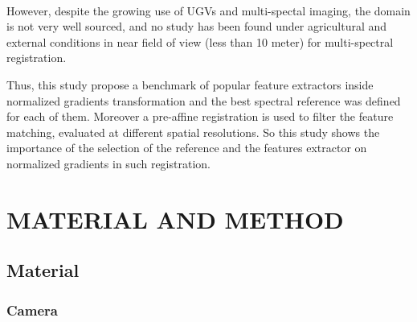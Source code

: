 \documentclass[a4paper,twoside]{article}
\begin{document}
	\\
	\par However, despite the growing use of UGVs and multi-spectal imaging, the domain is not very well sourced,
	and no study has been found under agricultural and external conditions in near field of view (less than 10 meter) for multi-spectral registration.
	\\
	\par Thus, this study propose a benchmark of popular feature extractors inside normalized gradients transformation
	and the best spectral reference was defined for each of them.
	Moreover a pre-affine registration is used to filter the feature matching, evaluated at different spatial resolutions.
	So this study shows the importance of the selection of the reference and the features extractor on normalized gradients in such registration.
	
	\section{\uppercase{Material and Method}}
	
	\subsection{Material}
	\subsubsection{Camera}
	
\end{document}
